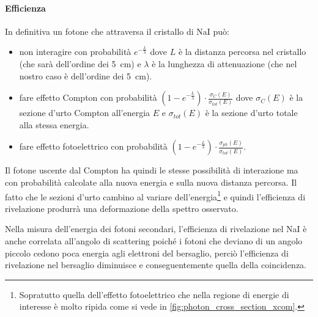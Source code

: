  \paragraph{Efficienza}
 In definitiva un fotone che attraversa il cristallo di NaI può: 
 \begin{itemize}
 	\item non interagire con probabilità $e^{-\frac{L}{\lambda}}$ dove $L$ è la distanza percorsa nel cristallo (che sarà dell'ordine dei \SI{5}{cm}) e $\lambda$ è la lunghezza di attenuazione (che nel nostro caso è dell'ordine dei \SI{5}{cm}).
 	\item fare effetto Compton con probabilità $(1-e^{-\frac{L}{\lambda}})\cdot \frac{\sigma_{C}(E)}{\sigma_{tot}(E)}$ dove $\sigma_{C}(E)$ è la sezione d'urto Compton all'energia $E$ e $\sigma_{tot}(E)$ è la sezione d'urto totale alla stessa energia.
 	\item fare effetto fotoelettrico con probabilità $(1-e^{-\frac{L}{\lambda}})\cdot \frac{\sigma_{ph}(E)}{\sigma_{tot}(E)}$.
 \end{itemize}
 Il fotone uscente dal Compton ha quindi le stesse possibilità di interazione ma con probabilità calcolate alla nuova energia e sulla nuova distanza percorsa.
 Il fatto che le sezioni d'urto cambino al variare dell'energia\footnote{Sopratutto quella dell'effetto fotoelettrico che nella regione di energie di interesse è molto ripida come si vede in \autoref{fig:photon_cross_section_xcom}.} e quindi l'efficienza di rivelazione produrrà una deformazione della spettro osservato.
 
 
 Nella misura dell'energia dei fotoni secondari, l'efficienza di rivelazione nel NaI è anche correlata all'angolo di scattering poiché i fotoni che deviano di un angolo piccolo cedono poca energia agli elettroni del bersaglio, perciò l'efficienza di rivelazione nel bersaglio diminuisce e conseguentemente quella della coincidenza.
 
